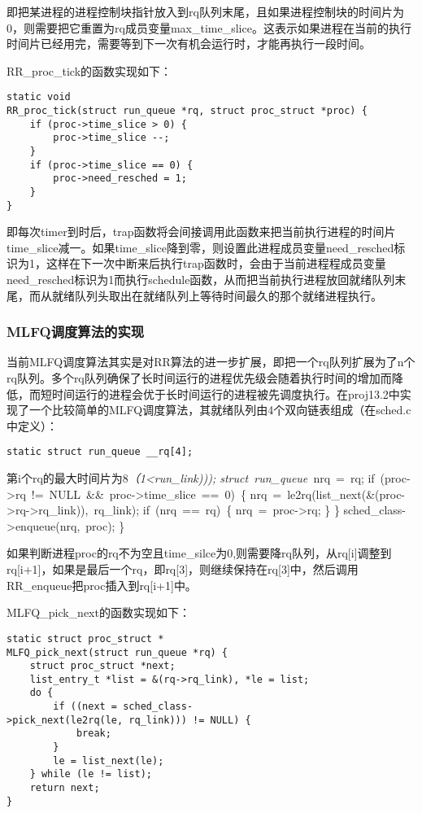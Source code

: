即把某进程的进程控制块指针放入到rq队列末尾，且如果进程控制块的时间片为0，则需要把它重置为rq成员变量max\_time\_slice。这表示如果进程在当前的执行时间片已经用完，需要等到下一次有机会运行时，才能再执行一段时间。

RR\_proc\_tick的函数实现如下：

\begin{lstlisting}
static void
RR_proc_tick(struct run_queue *rq, struct proc_struct *proc) {
    if (proc->time_slice > 0) {
        proc->time_slice --;
    }
    if (proc->time_slice == 0) {
        proc->need_resched = 1;
    }
}
\end{lstlisting}

即每次timer到时后，trap函数将会间接调用此函数来把当前执行进程的时间片time\_slice减一。如果time\_slice降到零，则设置此进程成员变量need\_resched标识为1，这样在下一次中断来后执行trap函数时，会由于当前进程程成员变量need\_resched标识为1而执行schedule函数，从而把当前执行进程放回就绪队列末尾，而从就绪队列头取出在就绪队列上等待时间最久的那个就绪进程执行。

\subsubsection{MLFQ调度算法的实现}\label{mlfqux8c03ux5ea6ux7b97ux6cd5ux7684ux5b9eux73b0}

当前MLFQ调度算法其实是对RR算法的进一步扩展，即把一个rq队列扩展为了n个rq队列。多个rq队列确保了长时间运行的进程优先级会随着执行时间的增加而降低，而短时间运行的进程会优于长时间运行的进程被先调度执行。在proj13.2中实现了一个比较简单的MLFQ调度算法，其就绪队列由4个双向链表组成（在sched.c中定义）：

\begin{lstlisting}
static struct run_queue __rq[4];
\end{lstlisting}

第i个rq的最大时间片为8\emph{（1\textless{}run\_link)));
struct~run\_queue~}nrq~=~rq;
if~(proc-\textgreater{}rq~!=~NULL~\&\&~proc-\textgreater{}time\_slice~==~0)~\{
nrq~=~le2rq(list\_next(\&(proc-\textgreater{}rq-\textgreater{}rq\_link)),~rq\_link);
if~(nrq~==~rq)~\{ nrq~=~proc-\textgreater{}rq; \} \}
sched\_class-\textgreater{}enqueue(nrq,~proc); \}

如果判断进程proc的rq不为空且time\_silce为0,则需要降rq队列，从rq{[}i{]}调整到rq{[}i+1{]}，如果是最后一个rq，即rq{[}3{]}，则继续保持在rq{[}3{]}中，然后调用RR\_enqueue把proc插入到rq{[}i+1{]}中。

MLFQ\_pick\_next的函数实现如下：

\begin{lstlisting}
static struct proc_struct *
MLFQ_pick_next(struct run_queue *rq) {
    struct proc_struct *next;
    list_entry_t *list = &(rq->rq_link), *le = list;
    do {
        if ((next = sched_class->pick_next(le2rq(le, rq_link))) != NULL) {
            break;
        }
        le = list_next(le);
    } while (le != list);
    return next;
}
\end{lstlisting}

